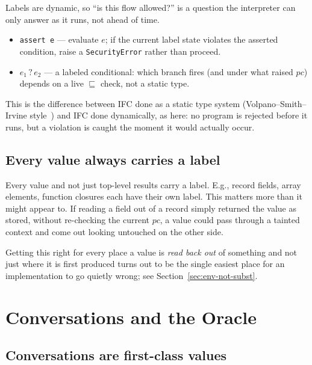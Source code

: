 \documentclass[11pt, a4paper]{article}
\newcommand{\flowsto}{\sqsubseteq}
\begin{document}
Labels are dynamic, so ``is this flow allowed?'' is a question the
interpreter can only answer as it runs, not ahead of time.

\begin{itemize}
  \item \lstinline{assert e} --- evaluate $e$; if the current label state
    violates the asserted condition, raise a \texttt{SecurityError} rather
    than proceed.
  \item $e_1 \mathbin{?} e_2$ --- a labeled conditional: which branch
    fires (and under what raised $pc$) depends on a live $\flowsto$ check,
    not a static type.
\end{itemize}

This is the difference between IFC done as a static type system
(Volpano--Smith--Irvine style~\cite{volpano1996}) and IFC done
dynamically, as here: no program is rejected before it runs, but a
violation is caught the moment it would actually occur.

\subsection{Every value always carries a label}

Every value and not just top-level results carry a label. E.g., record fields,
array elements, function closures each have their own label. This matters more
than it might appear to. If reading a field out of a record simply returned the
value as stored, without re-checking the current $pc$, a value could pass
through a tainted context and come out looking untouched on the other side.

Getting this right for every place a value is \emph{read back out} of something
and not just where it is first produced turns out to be the single easiest
place for an implementation to go quietly wrong; see
Section~\ref{sec:env-not-subst}.

\section{Conversations and the Oracle}

\subsection{Conversations are first-class values}
\end{document}
